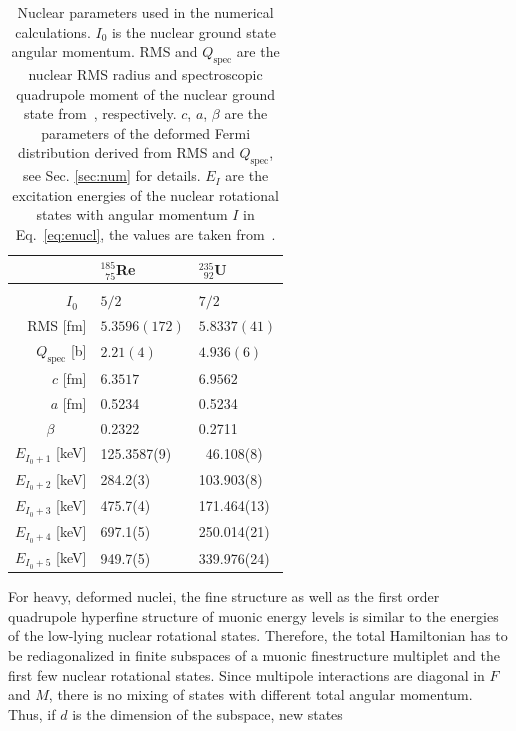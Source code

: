 \begin{table}[b]
\caption{\label{tab:params}%
Nuclear parameters used in the numerical calculations. $I_0$ is the nuclear ground state angular momentum. RMS and $Q_\text{spec}$ are the nuclear RMS radius and spectroscopic quadrupole moment of the nuclear ground state from~\cite{Angeli2013,Stone2005}, respectively. $c$, $a$, $\beta$ are the parameters of the deformed Fermi distribution derived from RMS and $Q_\text{spec}$, see Sec. \ref{sec:num} for details. $E_{I}$ are the excitation energies of the nuclear rotational states with angular momentum $I$ in Eq.~\eqref{eq:enucl}, the values are taken from~\cite{ENSDF}.}
\centering
\begin{tabular}{rll}
& $^{185}_{\phantom{1}75}$Re & $^{235}_{\phantom{1}92}$U\\ \hline \\[-10pt]
$I_0$ \hfill$\phantom{.}$ & $5/2$ & $7/2$ \\
RMS \hfill[fm] & $5.3596(172)$ & $5.8337(41)$ \\
$Q_\text{spec}$ \hfill[b] & $2.21(4)\phantom{111}$ & $4.936(6)\phantom{1}$ \\
$c$ \hfill[fm] & $6.3517$ & $6.9562$ \\
$a$ \hfill[fm] & 0.5234 & 0.5234 \\
$\beta$ \hfill$\phantom{.abc.}$ & 0.2322 & 0.2711 \\[7pt]
$E_{I_0 + 1}$ \hfill[keV] & 125.3587(9) &  $\phantom{1}$46.108(8) \\
$E_{I_0 + 2}$ \hfill[keV] & 284.2(3) & 103.903(8) \\
$E_{I_0 + 3}$ \hfill[keV] & 475.7(4) & 171.464(13) \\
$E_{I_0 + 4}$ \hfill[keV] & 697.1(5) & 250.014(21) \\
$E_{I_0 + 5}$ \hfill[keV] & 949.7(5) & 339.976(24) \\
\end{tabular}
\end{table}
For heavy, deformed nuclei, the fine structure as well as the first order quadrupole hyperfine structure of muonic energy levels is similar to the energies of the low-lying nuclear rotational states. Therefore, the total Hamiltonian has to be rediagonalized in finite subspaces of a muonic finestructure multiplet and the first few nuclear rotational states. Since multipole interactions are diagonal in $F$ and $M$, there is no mixing of states with different total angular momentum. Thus, if $d$ is the dimension of the subspace, new states
